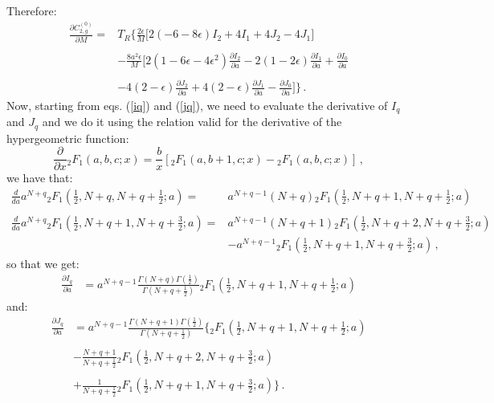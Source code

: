 \documentclass[10pt,a4paper]{article}
\begin{document}
Therefore:
\begin{equation}
\begin{array}{rl}
\displaystyle \frac{\partial C_{2,g}^{(0)}}{\partial M}=&\displaystyle T_R\Bigg\{\frac{2\epsilon}M\Big[2(-6-8\epsilon)I_2+4I_1+4J_2-4J_1\Big]\\
\\
&\displaystyle -\frac{8a^2\epsilon}{M}\Bigg[2(1-6\epsilon-4\epsilon^2)\frac{\partial I_2}{\partial a}-2(1-2\epsilon)\frac{\partial I_1}{\partial a}+\frac{\partial I_0}{\partial a}\\
\\
& \displaystyle -4(2-\epsilon)\frac{\partial J_2}{\partial a}+4(2-\epsilon)\frac{\partial J_1}{\partial a}-\frac{\partial J_0}{\partial a}\Bigg]\Bigg\}\,.
\end{array}
\end{equation}
Now, starting from eqs. (\ref{iq}) and (\ref{jq}), we need to evaluate the derivative of $I_q$ and $J_q$ and we do it using the relation valid for the derivative of the hypergeometric function:
\begin{equation}
\frac{\partial}{\partial x} {_2F_1}(a,b,c;x) = \frac{b}{x}\left[ {_2F_1}(a,b+1,c;x) - {_2F_1}(a,b,c;x)\right]\,,
\end{equation}
we have that:
\begin{equation}
\begin{array}{ll}
\displaystyle \frac{d}{da} a^{N+q} {_2F_1}\left(\frac12,N+q,N+q+\frac12;a\right) = &\displaystyle a^{N+q-1}(N+q) {_2F_1}\left(\frac12,N+q+1,N+q+\frac12;a\right)\\
\\
\displaystyle \frac{d}{da} a^{N+q} {_2F_1}\left(\frac12,N+q+1,N+q+\frac32;a\right) = &\displaystyle a^{N+q-1}(N+q+1) {_2F_1}\left(\frac12,N+q+2,N+q+\frac32;a\right)\\
&\displaystyle -a^{N+q-1}{_2F_1}\left(\frac12,N+q+1,N+q+\frac32;a\right)\,,
\end{array}
\end{equation}
so that we get:
\begin{equation}\label{diq}
\begin{array}{rl}
\displaystyle \frac{\partial I_q}{\partial a} &\displaystyle = a^{N+q-1}\frac{\Gamma(N+q)\Gamma(\frac12)}{\Gamma(N+q+\frac12)}{_2F_1}\left(\frac12,N+q+1,N+q+\frac12;a\right)
\end{array}
\end{equation}
and:
\begin{equation}\label{djq}
\begin{array}{rl}
\displaystyle \frac{\partial J_q}{\partial a} &\displaystyle =  a^{N+q-1}\frac{\Gamma(N+q+1)\Gamma(\frac12)}{\Gamma(N+q+\frac12)}\bigg\{{_2F_1}\left(\frac12,N+q+1,N+q+\frac12;a\right)\\
\\
&\displaystyle - \frac{N+q+1}{N+q+\frac12}{_2F_1}\left(\frac12,N+q+2,N+q+\frac32;a\right)\\
\\
&\displaystyle +\frac1{N+q+\frac12}{_2F_1}\left(\frac12,N+q+1,N+q+\frac32;a\right)\bigg\}\,.
\end{array}
\end{equation}
\end{document}
